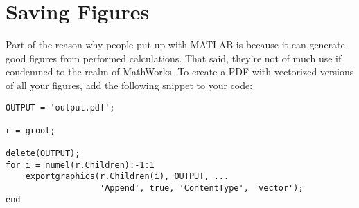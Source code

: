 \documentclass{article}
\begin{document}
\section{Saving Figures}

Part of the reason why people put up with MATLAB is because it can
generate good figures from performed calculations.  That said, they're
not of much use if condemned to the realm of MathWorks.  To create a PDF
with vectorized versions of all your figures, add the following snippet
to your code:

\begin{verbatim}
OUTPUT = 'output.pdf';

r = groot;

delete(OUTPUT);
for i = numel(r.Children):-1:1
    exportgraphics(r.Children(i), OUTPUT, ...
                   'Append', true, 'ContentType', 'vector');
end
\end{verbatim}
\end{document}
